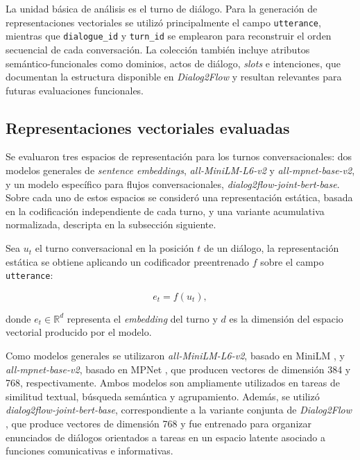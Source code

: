 \documentclass[runningheads]{llncs}
\begin{document}
La unidad básica de análisis es el turno de diálogo. Para la generación de representaciones vectoriales se utilizó principalmente el campo \texttt{utterance}, mientras que \texttt{dialogue\_id} y \texttt{turn\_id} se emplearon para reconstruir el orden secuencial de cada conversación. La colección también incluye atributos semántico-funcionales como dominios, actos de diálogo, \textit{slots} e intenciones, que documentan la estructura disponible en \textit{Dialog2Flow} y resultan relevantes para futuras evaluaciones funcionales.

\subsection{Representaciones vectoriales evaluadas}

Se evaluaron tres espacios de representación para los turnos conversacionales: dos modelos generales de \textit{sentence embeddings}, \textit{all-MiniLM-L6-v2} y \textit{all-mpnet-base-v2}, y un modelo específico para flujos conversacionales, \textit{dialog2flow-joint-bert-base}. Sobre cada uno de estos espacios se consideró una representación estática, basada en la codificación independiente de cada turno, y una variante acumulativa normalizada, descripta en la subsección siguiente.

Sea $u_t$ el turno conversacional en la posición $t$ de un diálogo, la representación estática se obtiene aplicando un codificador preentrenado $f$ sobre el campo \texttt{utterance}:

\begin{equation}
    e_t = f(u_t),
\end{equation}

\noindent donde $e_t \in \mathbb{R}^d$ representa el \textit{embedding} del turno y $d$ es la dimensión del espacio vectorial producido por el modelo.

Como modelos generales se utilizaron \textit{all-MiniLM-L6-v2}, basado en MiniLM \cite{wang2020minilm}, y \textit{all-mpnet-base-v2}, basado en MPNet \cite{song2020mpnet}, que producen vectores de dimensión 384 y 768, respectivamente. Ambos modelos son ampliamente utilizados en tareas de similitud textual, búsqueda semántica y agrupamiento. Además, se utilizó \textit{dialog2flow-joint-bert-base}, correspondiente a la variante conjunta de \textit{Dialog2Flow} \cite{burdisso2024dialog2flow}, que produce vectores de dimensión 768 y fue entrenado para organizar enunciados de diálogos orientados a tareas en un espacio latente asociado a funciones comunicativas e informativas.
\end{document}

